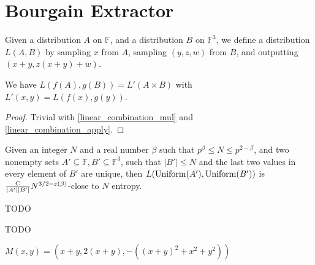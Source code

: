 \chapter{Bourgain Extractor}
\label{chap:bourgain}

\begin{definition}
    \label{lapply}
    \leanok
    Given a distribution $A$ on $\mathbb{F}$, and a distribution $B$ on $\mathbb{F}^3$, we define a distribution $L(A, B)$
    by sampling $x$ from $A$, sampling $(y, z, w)$ from $B$, and outputting
    $(x + y, z(x + y) + w)$.
\end{definition}

\begin{lemma}
    \label{lapply_linear_combination}
    \leanok
    We have $L(f(A), g(B)) = L'(A\times B)$ with $L'(x, y) = L(f(x), g(y))$.
\end{lemma}

\begin{proof}
    \leanok
    Trivial with \ref{linear_combination_mul} and \ref{linear_combination_apply}.
\end{proof}

\begin{theorem}
    \label{line_point_large_l2_aux}
    \leanok
    Given an integer $N$ and a real number $\beta$ such that $p^\beta \leq N \leq p^{2 - \beta}$, and
    two nonempty sets $A' \subseteq \mathbb{F}, B'\subseteq \mathbb{F}^3$, such that $|B'| \leq N$ and 
    the last two values in every element of $B'$ are unique, then
    $L(\operatorname{\operatorname{Uniform}}(A'), \operatorname{\operatorname{Uniform}}(B'))$ is $\frac{C}{|A'| |B'|} N^{3/2 - \operatorname{\varepsilon}(\beta)}$-close to $N$ entropy.
\end{theorem}

\begin{theorem}
    \label{line_point_large_l2t}
    \leanok
    TODO
\end{theorem}

\begin{theorem}
    \label{line_point_large_l2}
    \leanok
    TODO
\end{theorem}

\begin{definition}
    \label{lmap}
    \leanok
    $M(x, y) = (x+y, 2(x+y), -((x+y)^2 + x^2 + y^2))$
\end{definition}

